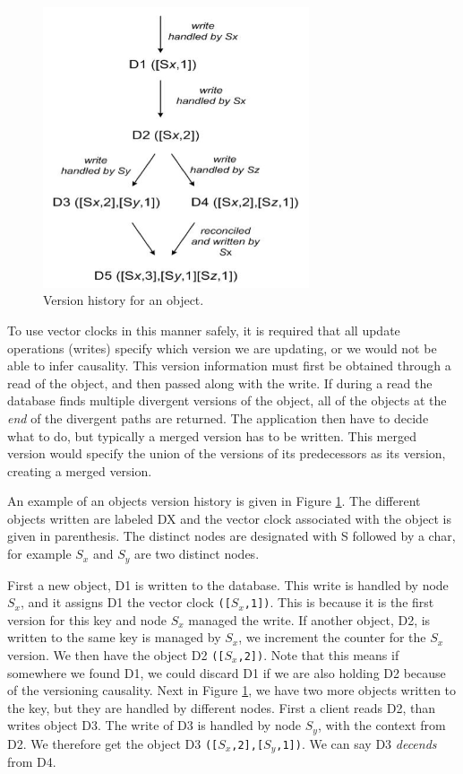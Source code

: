 \begin{figure}[h]
    \centering
    \includegraphics[width=0.7\textwidth]{introduction/versioning}
    \caption{Version history for an object\cite{voldemort}.}
    \label{fig:versioning}
\end{figure}

To use vector clocks in this manner safely, it is required that all update operations (writes) specify which version we are updating, or we would not be able to infer causality.
This version information must first be obtained through a read of the object, and then passed along with the write.
If during a read the database finds multiple divergent versions of the object, all of the objects at the \emph{end} of the divergent paths are returned.
The application then have to decide what to do, but typically a merged version has to be written. This merged version would specify the union of the versions of its predecessors as its version, creating a merged version.

An example of an objects version history is given in Figure \ref{fig:versioning}. 
The different objects written are labeled DX and the vector clock associated with the object is given in parenthesis. The distinct nodes are designated with S followed by a char, for example $S_x$ and $S_y$ are two distinct nodes.

First a new object, D1 is written to the database. This write is handled by node $S_x$, and it assigns D1 the vector clock \texttt{([$S_x$,1])}.
This is because it is the first version for this key and node $S_x$ managed the write. If another object, D2, is written to the same key is managed by $S_x$, we increment the counter for the $S_x$ version. We then have the object D2 \texttt{([$S_x$,2])}. Note that this means if somewhere we found D1, we could discard D1 if we are also holding D2 because of the versioning causality.
Next in Figure \ref{fig:versioning}, we have two more objects written to the key, but they are handled by different nodes.
First a client reads D2, than writes object D3. The write of D3 is handled by node $S_y$, with the context from D2. We therefore get the object D3 \texttt{([$S_x$,2],[$S_y$,1])}. We can say D3 \emph{decends} from D4.

